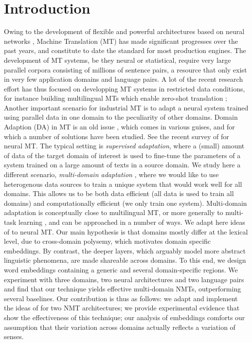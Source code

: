 \documentclass[a4paper]{article}
\newcommand{\jcTodo}[1]{\Todo[JC:]{\textcolor{orange}{#1}}}
\begin{document}
\section{Introduction \label{sec:introduction}}
Owing to the development of flexible and powerful architectures based on neural networks \cite{Cho14properties,Bahdanau15learning,Ghering17convolutional,Vaswani17attention}, Machine Translation (MT) has made significant progresses over the past years, and constitute to date the standard for most production engines. The development of MT systems, be they neural or statistical, require very large parallel corpora consisting of millions of sentence pairs, a resource that only exist in very few application domains and language pairs. A lot of the recent research effort has thus focused on developping MT systems in restricted data conditions, for instance building multilingual MTs which enable zero-shot translation \cite{Firat16multiway,Ha16towards,Johnson17google};
Another important scenario for industrial MT is to adapt a neural system trained using parallel data in one domain to the peculiarity of other domains. Domain Adaption (DA) in MT is an old issue \cite{Foster07mixture,Axelrod11domain}, which comes in various guises, and for which a number of solutions have been studied. See the recent survey of \cite{Chu18asurvey} for neural MT. The typical setting is \emph{supervised adaptation}, where a (small) amount of data of the target domain of interest is used to fine-tune the parameters of a system trained on a large amount of texts in a source domain. We study here a different scenario, \emph{multi-domain adaptation} \cite{Sennrich13multidomain,Farajian17multidomain}, where we would like to use heterogenous data sources to train a unique system that would work well for all domains. This allows us to be both data efficient (all data is used to train all domains) and computationally efficient (we only train one system).
Multi-domain adaptation is conceptually close to multilingual MT, or more generally to multi-task learning \cite{Caruana97multitask}, and can be approached in a number of ways. We adapt here ideas of \cite{Daume07frustratingly} to neural MT.
Our main hypothesis is that domains mostly differ at the lexical level, due to cross-domain polysemy, which motivates domain specific embeddings. By contrast, the deeper layers, which arguably model more abstract linguistic phenomena, are made shareable across domains. To this end, we design word embeddings containing a generic and several domain-specific regions. We experiment with three domains, two neural architectures and two language pairs and find that our technique yields effective multi-domain NMTs, outperforming several baselines. Our contribution is thus as follows:
we adapt and implement the ideas of \cite{Daume07frustratingly} for two NMT architectures;
we provide experimental evidence that show the effectiveness of this technique;
\jcTodo{focus on that the analysis of embeddings is an original technique.}
our analysis of embeddings comforts our assumption that their variation across domains actually reflects a variation of senses.
\end{document}
